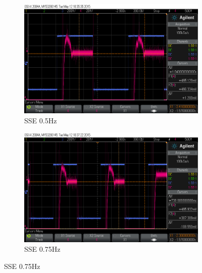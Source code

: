 \documentclass[11pt,a4paper]{article}
\begin{document}
\begin{enumerate}
\begin{figure}[H]
  \begin{subfigure}{0.5\textwidth}
  \includegraphics[width=0.95\linewidth]{Ossilloscope/PartD_0_5Hz_SSE.png}
  \caption{SSE 0.5Hz}
  \label{fig:subim2}
  \end{subfigure}	  
  \begin{subfigure}{0.5\textwidth}
  \includegraphics[width=0.95\linewidth]{Ossilloscope/PartD_0_75Hz_SSE.png}
  \caption{SSE 0.75Hz}
  \label{fig:subim2}
  \end{subfigure}
 

\end{figure}
\end{enumerate}
\end{document}
